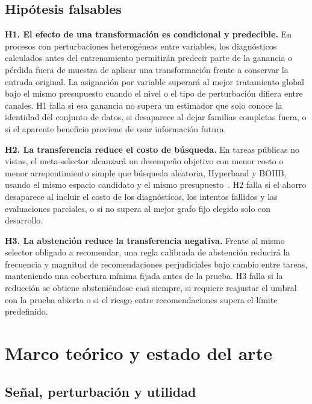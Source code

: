 \documentclass[11pt,letterpaper]{article}
\begin{document}
\subsection{Hipótesis falsables}

\noindent\textbf{H1. El efecto de una transformación es condicional y predecible.}
En procesos con perturbaciones heterogéneas entre variables, los diagnósticos calculados antes del entrenamiento permitirán predecir parte de la ganancia o pérdida fuera de muestra de aplicar una transformación frente a conservar la entrada original.
La asignación por variable superará al mejor tratamiento global bajo el mismo presupuesto cuando el nivel o el tipo de perturbación difiera entre canales.
H1 falla si esa ganancia no supera un estimador que solo conoce la identidad del conjunto de datos, si desaparece al dejar familias completas fuera, o si el aparente beneficio proviene de usar información futura.

\noindent\textbf{H2. La transferencia reduce el costo de búsqueda.}
En tareas públicas no vistas, el meta-selector alcanzará un desempeño objetivo con menor costo o menor arrepentimiento simple que búsqueda aleatoria, Hyperband y BOHB, usando el mismo espacio candidato y el mismo presupuesto~\cite{li2018hyperband,falkner2018bohb}.
H2 falla si el ahorro desaparece al incluir el costo de los diagnósticos, los intentos fallidos y las evaluaciones parciales, o si no supera al mejor grafo fijo elegido solo con desarrollo.

\noindent\textbf{H3. La abstención reduce la transferencia negativa.}
Frente al mismo selector obligado a recomendar, una regla calibrada de abstención reducirá la frecuencia y magnitud de recomendaciones perjudiciales bajo cambio entre tareas, manteniendo una cobertura mínima fijada antes de la prueba.
H3 falla si la reducción se obtiene absteniéndose casi siempre, si requiere reajustar el umbral con la prueba abierta o si el riesgo entre recomendaciones supera el límite predefinido.

\section{Marco teórico y estado del arte}

\subsection{Señal, perturbación y utilidad}
\end{document}
